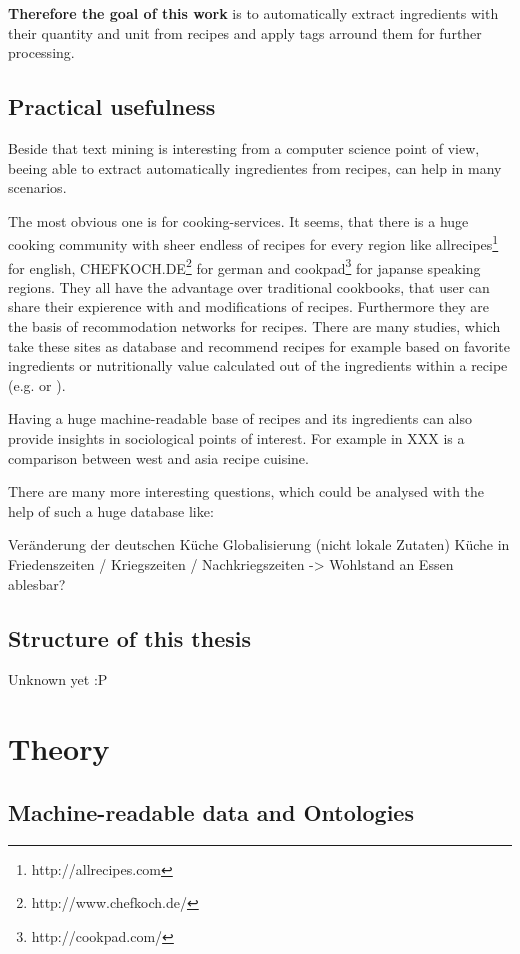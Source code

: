 \documentclass[12pt, twoside]{report}
\begin{document}
\textbf{Therefore the goal of this work} is to automatically extract ingredients with their quantity and unit from recipes and apply tags arround them for further processing.


\section{Practical usefulness}
Beside that text mining is interesting from a computer science point of view, beeing able to extract automatically ingredientes from recipes, can help in many scenarios.

The most obvious one is for cooking-services. It seems, that there is a huge cooking community with sheer endless of recipes for every region like allrecipes\footnote{http://allrecipes.com} for english, CHEFKOCH.DE\footnote{http://www.chefkoch.de/} for german and cookpad\footnote{http://cookpad.com/} for japanse speaking regions. They all have the advantage over traditional cookbooks, that user can share their expierence with and modifications of recipes. Furthermore they are the basis of recommodation networks for recipes. There are many studies, which take these sites as database and recommend recipes for example based on favorite ingredients or nutritionally value calculated out of the ingredients within a recipe (e.g. \cite{ingredientNetworks} or \cite{recipeRecommendation}).

Having a huge machine-readable base of recipes and its ingredients can also provide insights in sociological points of interest. For example in XXX is a comparison between west and asia recipe cuisine.

There are many more interesting questions, which could be analysed with the help of such a huge database like: 

	Veränderung der deutschen Küche
	Globalisierung (nicht lokale Zutaten)
	Küche in Friedenszeiten / Kriegszeiten / Nachkriegszeiten -> Wohlstand an Essen ablesbar?


\section{Structure of this thesis}
Unknown yet :P


\chapter{Theory}
\section{Machine-readable data and Ontologies}
\end{document}

